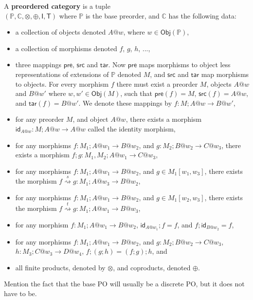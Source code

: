 \documentclass{article}
\begin{document}
\begin{definition}
  \label{def:preordered_cat}
  
  A \textbf{preordered category} is a tuple \\
  $(\mathbb{P}, \mathbb{C}, \otimes, \oplus, \mathsf{I}, \mathsf{T})$  
  where $\mathbb{P}$ is the base preorder, and $\mathbb{C}$ has the following data:
  
  \begin{itemize}
  \item a collection of objects denoted $A @ w$, where $w \in \mathsf{Obj}(\mathbb{P})$,
    
  \item a collection of morphisms denoted $f$, $g$, $h$, ...,
    
  \item three mappings $\mathsf{pre}$, $\mathsf{src}$ and
    $\mathsf{tar}$. Now $\mathsf{pre}$ maps morphisms to object less
    representations of extensions of $\mathbb{P}$ denoted $M$, and
    $\mathsf{src}$ and $\mathsf{tar}$ map morphisms to objects.  For
    every morphism $f$ there must exist a preorder $M$, objects $A @ w$ 
    and $B @ w'$ where $w,w' \in \mathsf{Obj}(M)$, such that $\mathsf{pre}(f) = M$, $\mathsf{src}(f)
    = A @ w$, and $\mathsf{tar}(f) = B @ w'$.  We denote these mappings by $f : M ; A @ w \to B
    @ w'$,

  \item for any preorder $M$, and object $A @ w$, there exists a morphism
    $\mathsf{id}_{A@w} : M; A @ w \to A @ w$ called the identity morphism,    

  \item for any morphisms $f : M_1 ; A @ w_1 \to B @ w_2$, and 
    $g : M_2 ; B @ w_2 \to C @ w_3$, there exists a morphism
    $f;g : M_1, M_2 ; A @ w_1 \to C @ w_3$,

  \item for any morphisms $f : M_1 ; A @ w_1 \to B @ w_2$, and 
    $g \in M_1[w_1, w_3]$, there exists the morphism 
    $f \stackrel{s}{\rightsquigarrow} g : M_1 ; A @ w_3 \to B @ w_2$,

  \item for any morphisms $f : M_1 ; A @ w_1 \to B @ w_2$, and 
    $g \in M_1[w_2, w_3]$, there exists the morphism 
    $f \stackrel{t}{\rightsquigarrow} g : M_1 ; A @ w_1 \to B @ w_3$,

  \item for any morphism $f : M_1 ; A @ w_1 \to B @ w_2$, 
    $\mathsf{id}_{A @ w_1} ; f = f$, and $f;\mathsf{id}_{B @ w_2} = f$,

  \item for any morphisms $f : M_1 ; A @ w_1 \to B @ w_2$, and 
    $g : M_2 ; B @ w_2 \to C @ w_3$, $h : M_3 ; C @ w_3 \to D @ w_4$,
    $f ; (g ; h) = (f ; g) ; h$, and

  \item all finite products, denoted by $\otimes$, and coproducts, denoted
    $\oplus$.
  \end{itemize}
\end{definition}
Mention the fact that the base PO will usually be a discrete PO, but
it does not have to be.
\end{document}
